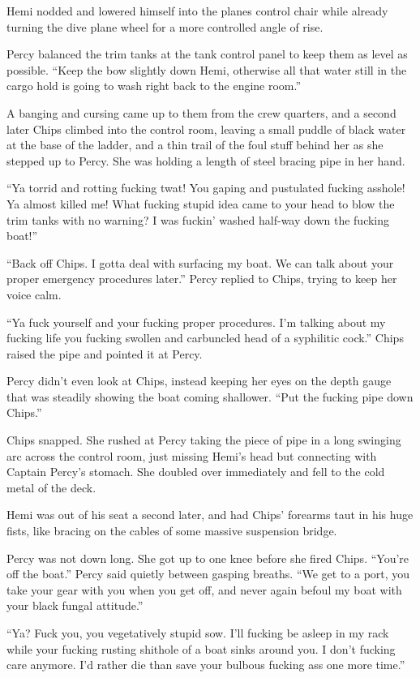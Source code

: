 \documentclass[]{article}
\begin{document}
\begin{multicols}{2}
Hemi nodded and lowered himself into the planes control chair while
already turning the dive plane wheel for a more controlled angle of
rise.

Percy balanced the trim tanks at the tank control panel to keep them as
level as possible. ``Keep the bow slightly down Hemi, otherwise all that
water still in the cargo hold is going to wash right back to the engine
room.''

A banging and cursing came up to them from the crew quarters, and a
second later Chips climbed into the control room, leaving a small puddle
of black water at the base of the ladder, and a thin trail of the foul
stuff behind her as she stepped up to Percy. She was holding a length of
steel bracing pipe in her hand.

``Ya torrid and rotting fucking twat! You gaping and pustulated fucking
asshole! Ya almost killed me! What fucking stupid idea came to your head
to blow the trim tanks with no warning? I was fuckin' washed half-way
down the fucking boat!''

``Back off Chips. I gotta deal with surfacing my boat. We can talk about
your proper emergency procedures later.'' Percy replied to Chips, trying
to keep her voice calm.

``Ya fuck yourself and your fucking proper procedures. I'm talking about
my fucking life you fucking swollen and carbuncled head of a syphilitic
cock.'' Chips raised the pipe and pointed it at Percy.

Percy didn't even look at Chips, instead keeping her eyes on the depth
gauge that was steadily showing the boat coming shallower. ``Put the
fucking pipe down Chips.''

Chips snapped. She rushed at Percy taking the piece of pipe in a long
swinging arc across the control room, just missing Hemi's head but
connecting with Captain Percy's stomach. She doubled over immediately
and fell to the cold metal of the deck.

Hemi was out of his seat a second later, and had Chips' forearms taut in
his huge fists, like bracing on the cables of some massive suspension
bridge.

Percy was not down long. She got up to one knee before she fired Chips.
``You're off the boat.'' Percy said quietly between gasping breaths.
``We get to a port, you take your gear with you when you get off, and
never again befoul my boat with your black fungal attitude.''

``Ya? Fuck you, you vegetatively stupid sow. I'll fucking be asleep in
my rack while your fucking rusting shithole of a boat sinks around you.
I don't fucking care anymore. I'd rather die than save your bulbous
fucking ass one more time.''


\end{multicols}
\end{document}
